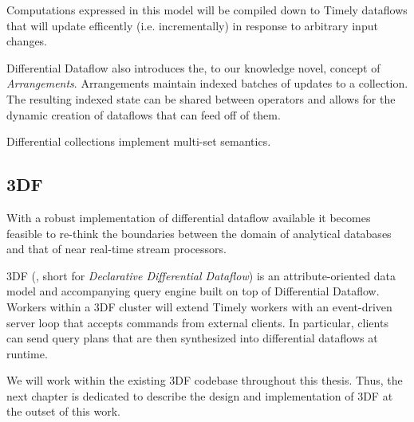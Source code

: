 \documentclass[../index.tex]{subfiles}
\begin{document}
Computations expressed in this model will be compiled down to Timely
dataflows that will update efficently (i.e. incrementally) in response
to arbitrary input changes.

Differential Dataflow also introduces the, to our knowledge novel,
concept of \emph{Arrangements}. Arrangements maintain indexed batches
of updates to a collection. The resulting indexed state can be shared
between operators and allows for the dynamic creation of dataflows
that can feed off of them.

Differential collections implement multi-set semantics.

\subsection{3DF}

With a robust implementation of differential dataflow available it
becomes feasible to re-think the boundaries between the domain of
analytical databases and that of near real-time stream processors.

3DF (\cite{declarative}, short for \emph{Declarative Differential
  Dataflow}) is an attribute-oriented data model and accompanying
query engine built on top of Differential Dataflow. Workers within a
3DF cluster will extend Timely workers with an event-driven server
loop that accepts commands from external clients. In particular,
clients can send query plans that are then synthesized into
differential dataflows at runtime.

We will work within the existing 3DF codebase throughout this
thesis. Thus, the next chapter is dedicated to describe the design and
implementation of 3DF at the outset of this work.
\end{document}

